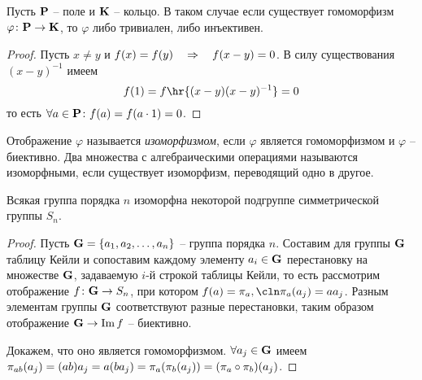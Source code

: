 \begin{theorem}
  Пусть $\mathbf{P}$ -- поле и $\mathbf{K}$ -- кольцо. В таком случае если существует гомоморфизм $\varphi\colon\mathbf{P}\to\mathbf{K}$, то $\varphi$ либо тривиален, либо инъективен.
\end{theorem}
\begin{proof}
  Пусть $x\neq y$ и $f(x)=f(y)\mathbin{\quad\Rightarrow \quad} f(x-y)=0$. В силу существования $(x-y)^{-1}$ имеем
  \begin{equation*}
    f(1)=f\hr{(x-y)(x-y)^{-1}}=0
  \end{equation*}
  то есть $\forall a\in\mathbf{P}\colon f(a)=f(a\cdot 1)=0$.
\end{proof}

\begin{df}
  Отображение $\varphi$ называется \emph{изоморфизмом}, если $\varphi$ является гомоморфизмом и $\varphi$ -- биективно. Два множества с алгебраическими операциями называются изоморфными, если существует изоморфизм, переводящий одно в другое.
\end{df}

\begin{theorem}[Кейли]
  Всякая группа порядка $n$ изоморфна некоторой подгруппе симметрической группы $S_n$.
\end{theorem}
\begin{proof}
  Пусть $\mathbf{G}=\{a_1,a_2,\dots,a_n\}$ -- группа порядка $n$. Составим для группы $\mathbf{G}$ таблицу Кейли и сопоставим каждому элементу $a_i\in\mathbf{G}$ перестановку на множестве $\mathbf{G}$, задаваемую $i$-й строкой таблицы Кейли, то есть рассмотрим отображение $f\colon \mathbf{G}\to S_n$, при котором $f(a)=\pi_a,\cln \pi_a(a_j)=aa_j$. Разным элементам группы $\mathbf{G}$ соответствуют разные перестановки, таким образом отображение $\mathbf{G}\to \mathop{\mathrm{Im}}\nolimits f$ -- биективно.

  Докажем, что оно является гомоморфизмом. $\forall a_j\in\mathbf{G}$ имеем $\pi_{ab}(a_j)\bw=(ab)a_j\bw=a(ba_j)\bw=\pi_a(\pi_b(a_j))\bw=(\pi_a\circ\pi_b)(a_j)$.
\end{proof}


